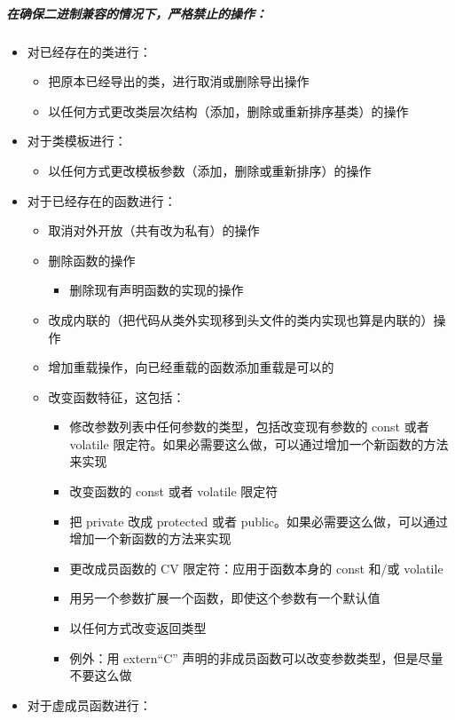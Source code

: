 \subparagraph{在确保二进制兼容的情况下，严格禁止的操作：}\label{ux5728ux786eux4fddux4e8cux8fdbux5236ux517cux5bb9ux7684ux60c5ux51b5ux4e0bux4e25ux683cux7981ux6b62ux7684ux64cdux4f5c}

\begin{itemize}
\item
  对已经存在的类进行：

  \begin{itemize}
 
  \item
    把原本已经导出的类，进行取消或删除导出操作
  \item
    以任何方式更改类层次结构（添加，删除或重新排序基类）的操作
  \end{itemize}
\item
  对于类模板进行：

  \begin{itemize}
  
  \item
    以任何方式更改模板参数（添加，删除或重新排序）的操作
  \end{itemize}
\item
  对于已经存在的函数进行：

  \begin{itemize}
  
  \item
    取消对外开放（共有改为私有）的操作
  \item
    删除函数的操作

    \begin{itemize}
    
    \item
      删除现有声明函数的实现的操作
    \end{itemize}
  \item
    改成内联的（把代码从类外实现移到头文件的类内实现也算是内联的）操作
  \item
    增加重载操作，向已经重载的函数添加重载是可以的
  \item
    改变函数特征，这包括：

    \begin{itemize}
    
    \item
      修改参数列表中任何参数的类型，包括改变现有参数的 const 或者
      volatile
      限定符。如果必需要这么做，可以通过增加一个新函数的方法来实现
    \item
      改变函数的 const 或者 volatile 限定符
    \item
      把 private 改成 protected 或者
      public。如果必需要这么做，可以通过增加一个新函数的方法来实现
    \item
      更改成员函数的 CV 限定符：应用于函数本身的 const 和/或 volatile
    \item
      用另一个参数扩展一个函数，即使这个参数有一个默认值
    \item
      以任何方式改变返回类型
    \item
      例外：用 extern``C''
      声明的非成员函数可以改变参数类型，但是尽量不要这么做
    \end{itemize}
  \end{itemize}
\item
  对于虚成员函数进行：


\end{itemize}

